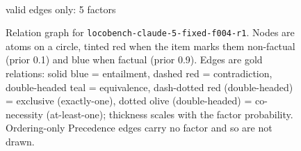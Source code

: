 \documentclass[11pt]{article}
\begin{document}
\begin{figure}[htbp]
\begin{minipage}[t]{0.48\linewidth}
{
}
\\[2pt]{\footnotesize valid edges only: 5 factors}
\end{minipage}
\caption{Relation graph for \texttt{locobench-claude-5-fixed-f004-r1}. Nodes are atoms on a circle, tinted red when the item marks them non-factual (prior 0.1) and blue when factual (prior 0.9). Edges are gold relations: solid blue = entailment, dashed red = contradiction, double-headed teal = equivalence, dash-dotted red (double-headed) = exclusive (exactly-one), dotted olive (double-headed) = co-necessity (at-least-one); thickness scales with the factor probability. Ordering-only Precedence edges carry no factor and so are not drawn.}
\label{fig:graph-locobench-claude-5-fixed-f004-r1}
\end{figure}
\end{document}
